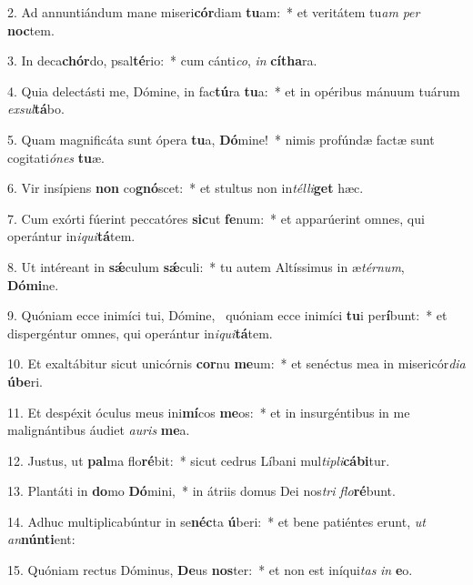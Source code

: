 2. Ad annuntiándum mane miseri\textbf{cór}diam \textbf{tu}am:~*  et veritátem tu\textit{am} \textit{per} \textbf{noc}tem.\

3. In deca\textbf{chór}do, psal\textbf{té}rio:~*  cum cánti\textit{co}, \textit{in} \textbf{cí}\textbf{tha}ra.\

4. Quia delectásti me, Dómine, in fac\textbf{tú}ra \textbf{tu}a:~*  et in opéribus mánuum tuárum \textit{ex}\textit{sul}\textbf{tá}bo.\

5. Quam magnificáta sunt ópera \textbf{tu}a, \textbf{Dó}mine!~*  nimis profúndæ factæ sunt cogitati\textit{ó}\textit{nes} \textbf{tu}æ.\

6. Vir insípiens \textbf{non} co\textbf{gnó}scet:~*  et stultus non in\textit{tél}\textit{li}\textbf{get} hæc.\

7. Cum exórti fúerint peccatóres \textbf{sic}ut \textbf{fe}num:~*  et apparúerint omnes, qui operántur in\textit{i}\textit{qui}\textbf{tá}tem.\

8. Ut intéreant in \textbf{sǽ}culum \textbf{sǽ}culi:~*  tu autem Altíssimus in æ\textit{tér}\textit{num}, \textbf{Dó}\textbf{mi}ne.\

9. Quóniam ecce inimíci tui, Dómine, \dag\  quóniam ecce inimíci \textbf{tu}i per\textbf{í}bunt:~*  et dispergéntur omnes, qui operántur in\textit{i}\textit{qui}\textbf{tá}tem.\

10. Et exaltábitur sicut unicórnis \textbf{cor}nu \textbf{me}um:~*  et senéctus mea in misericór\textit{di}\textit{a} \textbf{ú}\textbf{be}ri.\

11. Et despéxit óculus meus ini\textbf{mí}cos \textbf{me}os:~*  et in insurgéntibus in me malignántibus áudiet \textit{au}\textit{ris} \textbf{me}a.\

12. Justus, ut \textbf{pal}ma flo\textbf{ré}bit:~*  sicut cedrus Líbani mul\textit{ti}\textit{pli}\textbf{cá}\textbf{bi}tur.\

13. Plantáti in \textbf{do}mo \textbf{Dó}mini,~*  in átriis domus Dei nos\textit{tri} \textit{flo}\textbf{ré}bunt.\

14. Adhuc multiplicabúntur in se\textbf{néc}ta \textbf{ú}beri:~*  et bene patiéntes erunt, \textit{ut} \textit{an}\textbf{nún}\textbf{ti}ent:\

15. Quóniam rectus Dóminus, \textbf{De}us \textbf{nos}ter:~*  et non est iníqui\textit{tas} \textit{in} \textbf{e}o.\

